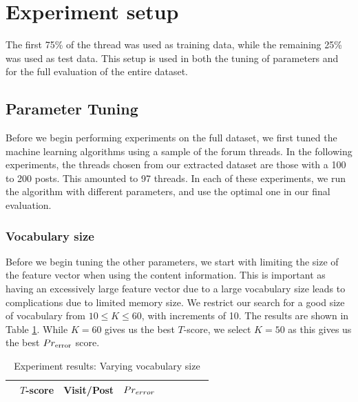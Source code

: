 \section{Experiment setup}
The first 75\% of the thread was used as training data, while the remaining 25\% 
was used as test data. This setup is used in both the tuning of parameters and 
for the full evaluation of the entire dataset.
%	

\subsection{Parameter Tuning}
Before we begin performing experiments on the full dataset, we first tuned the 
machine learning algorithms using a sample of the forum threads. In the 
following experiments, the threads chosen from our extracted dataset are those 
with a 100 to 200 posts. This amounted to 97 threads. In each of these 
experiments, we run the algorithm with different parameters, and use the optimal 
one in our final evaluation. 

\subsubsection{Vocabulary size}
Before we begin tuning the other parameters, we start with limiting the size of 
the feature vector when using the content information. This is important as 
having an excessively large feature vector due to a large vocabulary size leads 
to complications due to limited memory size. We restrict our search for a good 
size of vocabulary from $10 \leq K \leq 60$, with increments of 10.  The results 
are shown in Table \ref{table:vocab_exp}. While $K=60$ gives us the best 
$T$-score, we select $K=50$ as this gives us the best $Pr_{\text{error}}$ score.  
\begin{table}
	\footnotesize
\begin{center}
	\begin{tabular}{|l|c|c|c|c|c|c|c|c|}
	\hline
& $T$-score			   &	Visit/Post & 	$Pr_{error}$\\
	\hline
	
	\hline
	\end{tabular}
\end{center}
	\caption{Experiment results: Varying vocabulary size}
	\label{table:vocab_exp}
\end{table}



